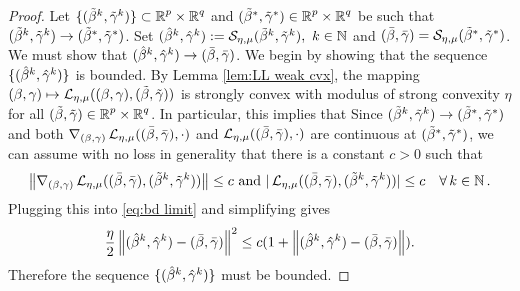 \begin{proof}
Let $\{(\tbeta^k,\tgam^k)\}\subset\Rp\times\Rq$ and 
$(\tbeta^*,\tgam^*)\in\Rp\times\Rq$ be such that 
$(\tbeta^k,\tgam^k)\rightarrow(\tbeta^*,\tgam^*)$.  
Set $(\hbeta^k,\hgam^k):=\SS_\emu(\tbeta^k,\tgam^k),\ k\in\N$
and $(\bbeta,\bgam)=\SS_\emu(\tbeta^*,\tgam^*)$. 
We must show that $(\hbeta^k,\hgam^k)\rightarrow (\bbeta,\bgam)$.
We begin by showing that the sequence $\{(\hbeta^k,\hgam^k)\}$
is bounded.
By Lemma \ref{lem:LL weak cvx}, the mapping $\bg\mapsto \LL_{\emu}(\bg,\tbg)$ is strongly convex with modulus of strong convexity $\eta$ for all $\tbg\in\Rp\times\Rq$.
In particular, this implies that
Since $(\tbeta^k,\tgam^k)\rightarrow(\tbeta^*,\tgam^*)$ and both
$\nabla_{\bg} \LL_{\emu}((\bbeta,\bgam),\cdot)$ and 
$\LL_{\emu}((\bbeta,\bgam),\cdot)$ are continuous at 
$(\tbeta^*,\tgam^*)$, we can assume with no loss in generality that there 
is a constant 
$c>0$ such that
\[
\norm{\nabla_{\bg} \LL_{\emu}((\bbeta,\bgam),\tbgk)}\le c\text{ and }
|\LL_{\emu}((\bbeta,\bgam),\tbgk)|\le c\quad\forall\, k\in \N.
\]
Plugging this into \eqref{eq:bd limit} and simplifying gives
\[
\frac{\eta}{2}\norm{(\hbeta^k,\hgam^k)-(\bbeta,\bgam)}^2
\le c(1+\norm{(\hbeta^k,\hgam^k)-(\bbeta,\bgam)}).
\]
Therefore the sequence $\{(\hbeta^k,\hgam^k)\}$ must be bounded.


\end{proof}
